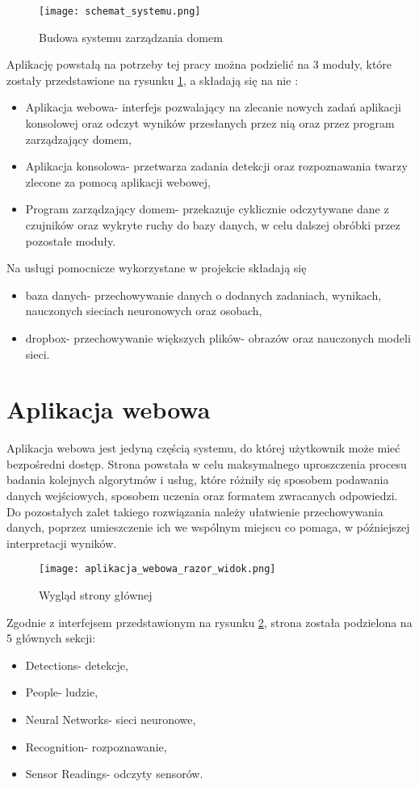 \begin{figure}[H]
	\centering
	\texttt{[image: schemat\_systemu.png]}
	\caption{Budowa systemu zarządzania domem}
	\label{fig:schemat_systemu}
\end{figure}
Aplikację powstałą na potrzeby tej pracy można podzielić na 3 moduły, które zostały przedstawione na rysunku \ref{fig:schemat_systemu}, a składają się na nie :
\begin{itemize}
\item Aplikacja webowa- interfejs pozwalający na zlecanie nowych zadań aplikacji konsolowej oraz odczyt wyników przesłanych przez nią oraz przez program zarządzający domem,
\item Aplikacja konsolowa- przetwarza zadania detekcji oraz rozpoznawania twarzy zlecone za pomocą aplikacji webowej,
\item Program zarządzający domem- przekazuje cyklicznie odczytywane dane z czujników oraz wykryte ruchy do bazy danych, w celu dalszej obróbki przez pozostałe moduły.
\end{itemize}
Na usługi pomocnicze wykorzystane w projekcie składają się
\begin{itemize}
\item baza danych- przechowywanie danych o dodanych zadaniach, wynikach, nauczonych sieciach neuronowych oraz osobach,
\item dropbox- przechowywanie większych plików- obrazów oraz nauczonych modeli sieci.
\end{itemize}

\section{Aplikacja webowa}
Aplikacja webowa jest jedyną częścią systemu, do której użytkownik może mieć bezpośredni dostęp. Strona powstała w celu maksymalnego uproszczenia procesu badania kolejnych algorytmów i usług, które różniły się sposobem podawania danych wejściowych, sposobem uczenia oraz formatem zwracanych odpowiedzi. Do pozostałych zalet takiego rozwiązania należy ułatwienie przechowywania danych, poprzez umieszczenie ich we wspólnym miejscu co pomaga, w późniejszej interpretacji wyników.
\begin{figure}[H]
	\centering
	\texttt{[image: aplikacja\_webowa\_razor\_widok.png]}
	\caption{Wygląd strony głównej}
	\label{fig:strona_glowna_razor}
\end{figure}
Zgodnie z interfejsem przedstawionym na rysunku \ref{fig:strona_glowna_razor}, strona została podzielona na 5 głównych sekcji:
\begin{itemize}
\item Detections- detekcje,
\item People- ludzie,
\item Neural Networks- sieci neuronowe,
\item Recognition- rozpoznawanie,
\item Sensor Readings- odczyty sensorów.
\end{itemize}
